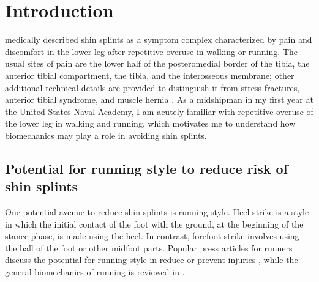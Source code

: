 \section{Introduction}

\citet{slocum1967shin} medically described shin splints as a symptom complex characterized by pain and discomfort in the lower leg after repetitive overuse in walking or running. The usual sites of pain are the lower half of the posteromedial border of the tibia, the anterior tibial compartment, the tibia, and the interosseous membrane; other additional technical details are provided to distinguish it from stress fractures, anterior tibial syndrome, and muscle hernia \citep{slocum1967shin}. As a midshipman in my first year at the United States Naval Academy, I am acutely familiar with repetitive overuse of the lower leg in walking and running, which motivates me to understand how biomechanics may play a role in avoiding shin splints. 

\subsection{Potential for running style to reduce risk of shin splints}
One potential avenue to reduce shin splints is running style. Heel-strike is a style in which the initial contact of the foot with the ground, at the beginning of the stance phase, is made using the heel. In contrast, forefoot-strike involves using the ball of the foot or other midfoot parts. Popular press articles for runners discuss the potential for running style in reduce or prevent injuries \citep{douglas2012midfoot, giandolini2013impact}, while the general biomechanics of running is reviewed in \citep{chan1994foot, lieberman2020biomechanical, bramble2004endurance, lieberman2010foot}. 

